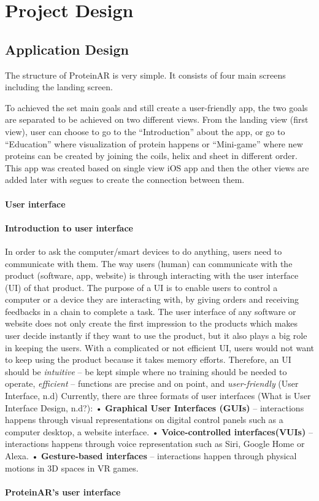 \chapter{Project Design}
\label{ch:design}

\section{Application Design}
The structure of ProteinAR is very simple. It consists of four main screens including the landing screen. 
 

To achieved the set main goals and still create a user-friendly app, the two goals are separated to be achieved on two different views. 
From the landing view (first view), user can choose to go to the “Introduction” about the app, or go to “Education” where visualization of protein happens or “Mini-game” where new proteins can be created by joining the coils, helix and sheet in different order. 
This app was created based on single view iOS app and then the other views are added later with segues to create the connection between them.

\subsubsection{User interface}
\subsubsection{Introduction to user interface}
In order to ask the computer/smart devices to do anything, users need to communicate with them. The way users (human) can communicate with the product (software, app, website) is through interacting with the user interface (UI) of that product. The purpose of a UI is to enable users to control a computer or a device they are interacting with, by giving orders and receiving feedbacks in a chain to complete a task. 
The user interface of any software or website does not only create the first impression to the products which makes user decide instantly if they want to use the product, but it also plays a big role in keeping the users. With a complicated or not efficient UI, users would not want to keep using the product because it takes memory efforts. Therefore, an UI should be \emph{intuitive} – be kept simple where no training should be needed to operate, \emph{efficient} – functions are precise and on point, and \emph{user-friendly} (User Interface, n.d)
Currently, there are three formats of user interfaces (What is User Interface Design, n.d?):
•	 \textbf{Graphical User Interfaces (GUIs)} – interactions happens through visual representations on digital control panels such as a computer desktop, a website interface.
•	 \textbf{Voice-controlled interfaces(VUIs)} – interactions happens through voice representation such as Siri, Google Home or Alexa.
•	 \textbf{Gesture-based interfaces} – interactions happen through physical motions in 3D spaces in VR games.

\subsubsection{ProteinAR’s user interface}

